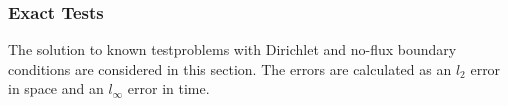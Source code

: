 %
%
%
%
%
%
%
%
%
%


\subsubsection{Exact Tests}
The solution to known testproblems with Dirichlet and no-flux boundary conditions are considered in this section. The errors are calculated as an $l_2$ error in space and an $l_\infty$ error in time.
